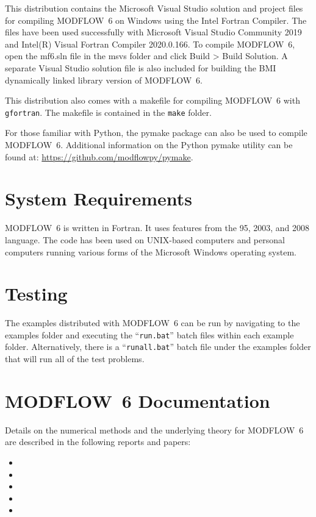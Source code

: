 \documentclass[11pt,twoside,twocolumn]{usgsreport}
\begin{document}
This distribution contains the Microsoft Visual Studio solution and project files for compiling MODFLOW~6 on Windows using the Intel Fortran Compiler.  The files have been used successfully with Microsoft Visual Studio Community 2019 and Intel(R) Visual Fortran Compiler 2020.0.166.  To compile MODFLOW~6, open the mf6.sln file in the msvs folder and click Build >  Build Solution.  A separate Visual Studio solution file is also included for building the BMI dynamically linked library version of MODFLOW~6.

This distribution also comes with a makefile for compiling MODFLOW~6 with \texttt{gfortran}.  The makefile is contained in the \texttt{make} folder.

For those familiar with Python, the pymake package can also be used to compile MODFLOW~6.  Additional information on the Python pymake utility can be found at: \url{https://github.com/modflowpy/pymake}.  

\section{System Requirements}
MODFLOW~6 is written in Fortran.  It uses features from the 95, 2003, and 2008 language.  The code has been used on UNIX-based computers and personal computers running various forms of the Microsoft Windows operating system.

\section{Testing}
The examples distributed with MODFLOW~6 can be run by navigating to the examples folder and executing the ``\texttt{run.bat}'' batch files within each example folder.  Alternatively, there is a ``\texttt{runall.bat}'' batch file under the examples folder that will run all of the test problems.

\section{MODFLOW~6 Documentation}
Details on the numerical methods and the underlying theory for MODFLOW~6 are described in the following reports and papers:

\begin{itemize}

\item {}

\item {}

\item {}

\item {}

\item {}

\end{itemize}
 
\end{document}
